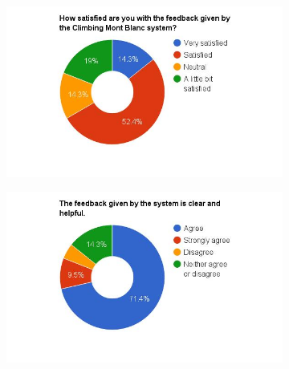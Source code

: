 \begin{figure}
    \centering
    \hspace*{-1.5cm}
    \begin{subfigure}[h]{0.5\textwidth}
        \includegraphics[width=1.5\textwidth, height=1.0\textwidth]{results/feedback_cmb.jpg}
        \caption{}
        \label{fig:cmb-feedback}
    \end{subfigure}
    \hfill
    \begin{subfigure}[h]{0.5\textwidth}
        \includegraphics[width=1.5\textwidth, height=1.0\textwidth]{results/clear_feedback_cmb.jpg}
        \caption{}
        \label{fig:cmb-feedback-clear}
    \end{subfigure}


\end{figure}
